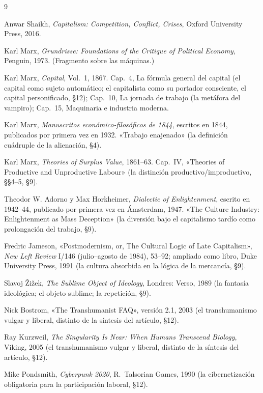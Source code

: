 \documentclass[11pt]{article}
\begin{document}
\begin{thebibliography}{9}

 Anwar Shaikh, \textit{Capitalism: Competition,
Conflict, Crises}, Oxford University Press, 2016.

 Karl Marx, \textit{Grundrisse: Foundations of the
Critique of Political Economy}, Penguin, 1973. (Fragmento sobre las
máquinas.)

 Karl Marx, \textit{Capital}, Vol.~1, 1867. Cap.~4,
La fórmula general del capital (el capital como sujeto automático; el
capitalista como su portador consciente, el capital personificado, §12);
Cap.~10, La jornada de trabajo (la metáfora del vampiro); Cap.~15,
Maquinaria e industria moderna.

 Karl Marx, \textit{Manuscritos
econ\'omico-filos\'oficos de 1844}, escritos en 1844, publicados por
primera vez en 1932. «Trabajo enajenado» (la definición cuádruple de
la alienación, §4).

 Karl Marx, \textit{Theories of Surplus Value},
1861--63. Cap.~IV, «Theories of Productive and Unproductive Labour»
(la distinción productivo/improductivo, §§4--5, §9).

 Theodor W. Adorno y Max Horkheimer,
\textit{Dialectic of Enlightenment}, escrito en 1942--44, publicado por
primera vez en Ámsterdam, 1947. «The Culture Industry: Enlightenment as
Mass Deception» (la diversión bajo el capitalismo tardío como
prolongación del trabajo, §9).

 Fredric Jameson, «Postmodernism, or, The Cultural
Logic of Late Capitalism», \textit{New Left Review} I/146 (julio--agosto
de 1984), 53--92; ampliado como libro, Duke University Press, 1991 (la
cultura absorbida en la lógica de la mercancía, §9).

 Slavoj \v{Z}i\v{z}ek, \textit{The Sublime Object of
Ideology}, Londres: Verso, 1989 (la fantasía ideológica; el objeto
sublime; la repetición, §9).

 Nick Bostrom, «The Transhumanist FAQ», versión
2.1, 2003 (el transhumanismo vulgar y liberal, distinto de la síntesis
del artículo, §12).

 Ray Kurzweil, \textit{The Singularity Is Near:
When Humans Transcend Biology}, Viking, 2005 (el transhumanismo vulgar
y liberal, distinto de la síntesis del artículo, §12).

 Mike Pondsmith, \textit{Cyberpunk 2020},
R.~Talsorian Games, 1990 (la cibernetización obligatoria para la
participación laboral, §12).


\end{thebibliography}
\end{document}
